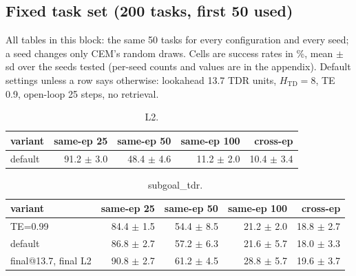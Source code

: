 \subsection*{Fixed task set (200 tasks, first 50 used)}
All tables in this block: the same 50 tasks for every configuration and every seed; a seed changes only CEM's random draws. Cells are success rates in \%, mean $\pm$ sd over the seeds tested (per-seed counts and values are in the appendix). Default settings unless a row says otherwise: lookahead 13.7 TDR units, $H_{\mathrm{TD}}=8$, TE 0.9, open-loop 25 steps, no retrieval.

\begin{table}[H]
\centering\small
\caption{L2.}
\label{tab:gas-mpc-l2-task200-n50}
\begin{tabular}{lrrrr}
\toprule
variant & same-ep 25 & same-ep 50 & same-ep 100 & cross-ep \\
\midrule
default & 91.2 $\pm$ 3.0 & 48.4 $\pm$ 4.6 & 11.2 $\pm$ 2.0 & 10.4 $\pm$ 3.4 \\
\bottomrule
\end{tabular}
\end{table}

\begin{table}[H]
\centering\small
\caption{subgoal\_tdr.}
\label{tab:gas-mpc-subgoal_tdr-task200-n50}
\begin{tabular}{lrrrr}
\toprule
variant & same-ep 25 & same-ep 50 & same-ep 100 & cross-ep \\
\midrule
TE=0.99 & 84.4 $\pm$ 1.5 & 54.4 $\pm$ 8.5 & 21.2 $\pm$ 2.0 & 18.8 $\pm$ 2.7 \\
default & 86.8 $\pm$ 2.7 & 57.2 $\pm$ 6.3 & 21.6 $\pm$ 5.7 & 18.0 $\pm$ 3.3 \\
final@13.7, final L2 & 90.8 $\pm$ 2.7 & 61.2 $\pm$ 4.5 & 28.8 $\pm$ 5.7 & 19.6 $\pm$ 3.7 \\
\bottomrule
\end{tabular}
\end{table}

